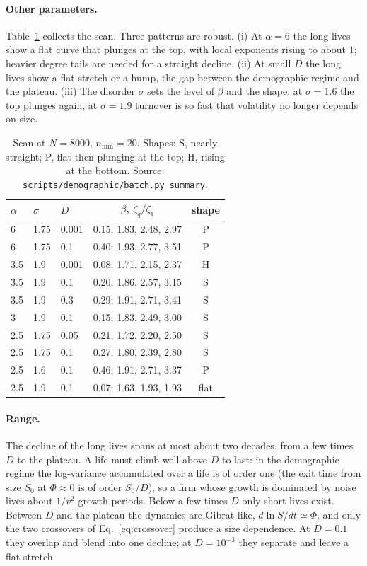 \documentclass[pre,twocolumn,superscriptaddress,nofootinbib]{revtex4-2}
\begin{document}
\paragraph{Other parameters.}  Table~\ref{tab:params} collects the scan.  Three patterns are
robust.  (i) At $\alpha=6$ the long lives show a flat curve that plunges at the top, with
local exponents rising to about $1$; heavier degree tails are needed for a straight decline.
(ii) At small $D$ the long lives show a flat stretch or a hump, the gap between the demographic
regime and the plateau.  (iii) The disorder $\sigma$ sets the level of $\beta$ and the shape: at
$\sigma=1.6$ the top plunges again, at $\sigma=1.9$ turnover is so fast that volatility no longer
depends on size.

\begin{table}[b]
\caption{Scan at $N=8000$, $n_{\min}=20$.  Shapes: S, nearly straight; P, flat then plunging at the top;
H, rising at the bottom.  Source: \texttt{scripts/demographic/batch.py summary}.}
\label{tab:params}
\begin{ruledtabular}
\begin{tabular}{lllcc}
$\alpha$ & $\sigma$ & $D$ & $\beta$, $\zeta_q/\zeta_1$ & shape\\
\hline
6   & 1.75 & 0.001 & 0.15; 1.83, 2.48, 2.97 & P\\
6   & 1.75 & 0.1   & 0.40; 1.93, 2.77, 3.51 & P\\
3.5 & 1.9  & 0.001 & 0.08; 1.71, 2.15, 2.37 & H\\
3.5 & 1.9  & 0.1   & 0.20; 1.86, 2.57, 3.15 & S\\
3.5 & 1.9  & 0.3   & 0.29; 1.91, 2.71, 3.41 & S\\
3   & 1.9  & 0.1   & 0.15; 1.83, 2.49, 3.00 & S\\
2.5 & 1.75 & 0.05  & 0.21; 1.72, 2.20, 2.50 & S\\
2.5 & 1.75 & 0.1   & 0.27; 1.80, 2.39, 2.80 & S\\
2.5 & 1.6  & 0.1   & 0.46; 1.91, 2.71, 3.37 & P\\
2.5 & 1.9  & 0.1   & 0.07; 1.63, 1.93, 1.93 & flat\\
\end{tabular}
\end{ruledtabular}
\end{table}

\paragraph{Range.}  The decline of the long lives spans at most about two decades, from a few
times $D$ to the plateau.  A life must climb well above $D$ to last: in the demographic regime the
log-variance accumulated over a life is of order one (the exit time from size $S_0$ at $\Phi\approx0$
is of order $S_0/D$), so a firm whose growth is dominated by noise lives about $1/v^2$ growth
periods.  Below a few times $D$ only short lives exist.  Between $D$ and the plateau the dynamics are
Gibrat-like, $d\ln S/dt\simeq\Phi$, and only the two crossovers of Eq.~\eqref{eq:crossover} produce a size
dependence.  At $D=0.1$ they overlap and blend into one decline; at $D=10^{-3}$ they separate and
leave a flat stretch.
\end{document}
